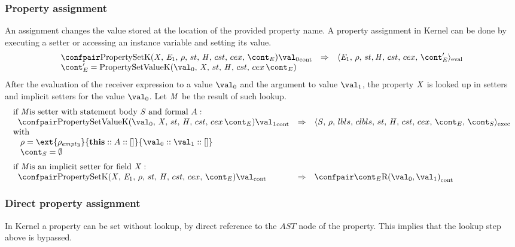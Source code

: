 \documentclass{article}
\begin{document}
\subsubsection{Property assignment}
\label{subsubsec:property-assignment}
An assignment changes the value stored at the location of the provided property name.
A property assignment in Kernel can be done by executing a setter or accessing an instance variable and setting its value.
\[
  \begin{array}{lcl}
	\cesktrans{
		\contconf{\PropertySetK}{\val_0}}{
		\evalconf{\expressionmeta_1}{\env}{\strace}{\cstrace}{\cex}{\econt'}}\\
	\econt' = \PropertySetVK
  \end{array}
\]
\noindent
After the evaluation of the receiver expression to a value $\val_0$ and the argument to value $\val_1$, the property $\mathit{X}$ is looked up in setters and implicit setters for the value $\val_0$. Let $\mathit{M}$ be the result of such lookup.
\[
  \begin{array}{lcl}
	\textrm{if \membermeta is setter with statement body }\stmt \textrm{ and formal }\formal :\\
	\hspace{2mm}
	\cesktrans{
		\contconf{\PropertySetVK}{\val_1}}{
		\execconf{\stmt}{\env}{\lbls}{\clbls}{\handler}{\cstrace}{\cex}{\econt}{\scont}}\\
	\textrm{with}\\
	\hspace{3mm}
	\env = \ext{\env_{empty}}{\mathbf{this} :: \formal :: []}{\val_0 :: \val_1 :: []}\\
	\hspace{3mm}
	\scont = \emptyset\\[2mm]

	\textrm{if \membermeta is an implicit setter for field }\idmeta :\\
	\hspace{2mm}
	\cesktrans{
		\contconf{\PropertySetK}{\val}}{
		\contconf{\econt}{\textrm{R}(\val_0, \val_1)}}
  \end{array}
\]

\subsubsection{Direct property assignment}
\label{subsubsec:direct-property-assignment}
In Kernel a property can be set without lookup, by direct reference to the $AST$ node of the property. This implies that the lookup step above is bypassed.
\end{document}
